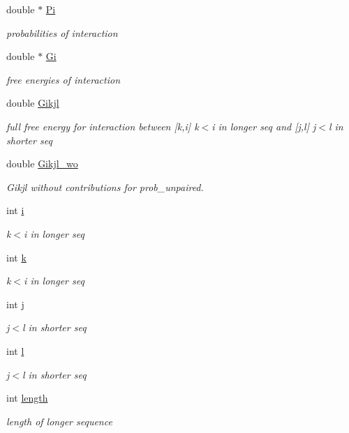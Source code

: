 \begin{DoxyCompactItemize}
\item 
double $\ast$ \mbox{\hyperlink{group__data__structures_a1fc8b3860c083f164daa9712690a3a56}{Pi}}
\begin{DoxyCompactList}\small\item\em probabilities of interaction \end{DoxyCompactList}\item 
double $\ast$ \mbox{\hyperlink{group__data__structures_a54f8183542fff4c32ab7ace49a16c02c}{Gi}}
\begin{DoxyCompactList}\small\item\em free energies of interaction \end{DoxyCompactList}\item 
double \mbox{\hyperlink{group__data__structures_ad58303190f9e085c3ab59890cbf61223}{Gikjl}}
\begin{DoxyCompactList}\small\item\em full free energy for interaction between \mbox{[}k,i\mbox{]} k$<$i in longer seq and \mbox{[}j,l\mbox{]} j$<$l in shorter seq \end{DoxyCompactList}\item 
double \mbox{\hyperlink{group__data__structures_a41793812abae560805414761fec398fe}{Gikjl\+\_\+wo}}
\begin{DoxyCompactList}\small\item\em Gikjl without contributions for prob\+\_\+unpaired. \end{DoxyCompactList}\item 
int \mbox{\hyperlink{group__data__structures_ab6d031a21388be8763b75ea74c937f17}{i}}
\begin{DoxyCompactList}\small\item\em k$<$i in longer seq \end{DoxyCompactList}\item 
int \mbox{\hyperlink{group__data__structures_a61e457fbf943d57364be6ddf1b4e7b8a}{k}}
\begin{DoxyCompactList}\small\item\em k$<$i in longer seq \end{DoxyCompactList}\item 
int \mbox{\hyperlink{group__data__structures_a7555cb6363d1479341eb72b9c087aa34}{j}}
\begin{DoxyCompactList}\small\item\em j$<$l in shorter seq \end{DoxyCompactList}\item 
int \mbox{\hyperlink{group__data__structures_a030ab45056342e12cb3955e4defd3904}{l}}
\begin{DoxyCompactList}\small\item\em j$<$l in shorter seq \end{DoxyCompactList}\item 
int \mbox{\hyperlink{group__data__structures_ac9fcb5dca54ec5faa76e02b6488b9524}{length}}
\begin{DoxyCompactList}\small\item\em length of longer sequence \end{DoxyCompactList}\end{DoxyCompactItemize}


